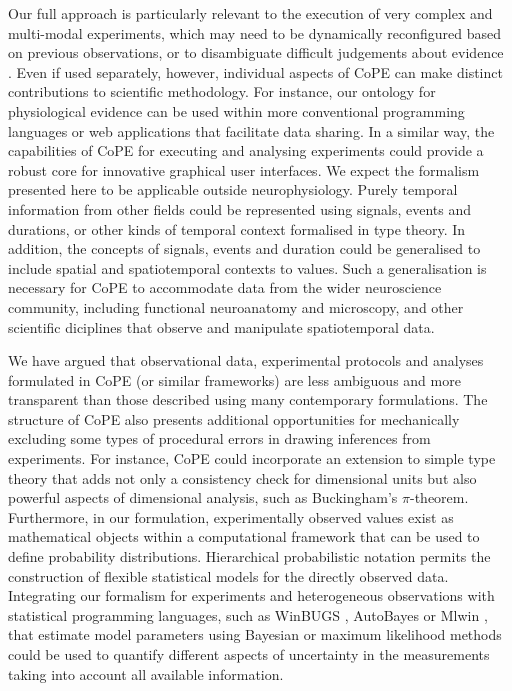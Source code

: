 Our full approach is particularly relevant to the execution of very
complex and multi-modal experiments, which may need to be dynamically
reconfigured based on previous observations, or to disambiguate
difficult judgements about evidence \citep{Kriegeskorte2009}. Even if
used separately, however, individual aspects of CoPE can make distinct
contributions to scientific methodology. For instance, our ontology
for physiological evidence can be used within more conventional
programming languages or web applications that facilitate data
sharing. In a similar way, the capabilities of CoPE for executing and
analysing experiments could provide a robust core for innovative
graphical user interfaces. We expect the formalism presented here to
be applicable outside neurophysiology. Purely temporal information
from other fields could be represented using signals, events and
durations, or other kinds of temporal context formalised in type
theory. In addition, the concepts of signals, events and duration
could be generalised to include spatial and spatiotemporal contexts to
values. Such a generalisation is necessary for CoPE to accommodate
data from the wider neuroscience community, including functional
neuroanatomy and microscopy, and other scientific diciplines that
observe and manipulate spatiotemporal data.

We have argued that observational data, experimental protocols and
analyses formulated in CoPE (or similar frameworks) are less ambiguous
and more transparent than those described using many contemporary
formulations. The structure of CoPE also presents additional
opportunities for mechanically excluding some types of procedural
errors in drawing inferences from experiments. For instance, CoPE
could incorporate an extension to simple type theory
\citep{Kennedy1997} that adds not only a consistency check for
dimensional units but also powerful aspects of dimensional analysis,
such as Buckingham's $\pi$-theorem. Furthermore, in our formulation,
experimentally observed values exist as mathematical objects within a
computational framework that can be used to define probability
distributions. Hierarchical probabilistic notation \citep{Gelman2006}
permits the construction of flexible statistical models for the
directly observed data. Integrating our formalism for experiments and
heterogeneous observations with statistical programming languages,
such as WinBUGS \citep{Gilks1994}, AutoBayes \citep{AutoBayes} or
Mlwin \citep{mlwin}, that estimate model parameters using Bayesian or
maximum likelihood methods could be used to quantify different aspects
of uncertainty in the measurements taking into account all available
information.


